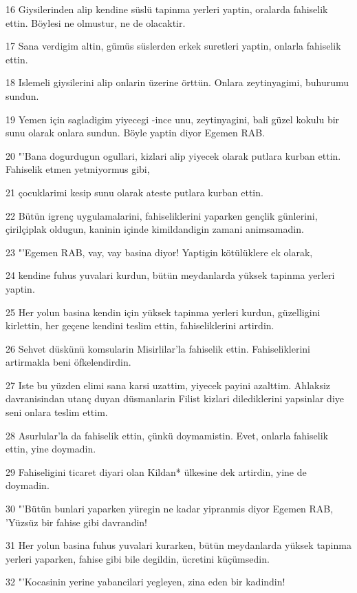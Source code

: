\par 16 Giysilerinden alip kendine süslü tapinma yerleri yaptin, oralarda fahiselik ettin. Böylesi ne olmustur, ne de olacaktir.
\par 17 Sana verdigim altin, gümüs süslerden erkek suretleri yaptin, onlarla fahiselik ettin.
\par 18 Islemeli giysilerini alip onlarin üzerine örttün. Onlara zeytinyagimi, buhurumu sundun.
\par 19 Yemen için sagladigim yiyecegi -ince unu, zeytinyagini, bali güzel kokulu bir sunu olarak onlara sundun. Böyle yaptin diyor Egemen RAB.
\par 20 "'Bana dogurdugun ogullari, kizlari alip yiyecek olarak putlara kurban ettin. Fahiselik etmen yetmiyormus gibi,
\par 21 çocuklarimi kesip sunu olarak ateste putlara kurban ettin.
\par 22 Bütün igrenç uygulamalarini, fahiseliklerini yaparken gençlik günlerini, çirilçiplak oldugun, kaninin içinde kimildandigin zamani animsamadin.
\par 23 "'Egemen RAB, vay, vay basina diyor! Yaptigin kötülüklere ek olarak,
\par 24 kendine fuhus yuvalari kurdun, bütün meydanlarda yüksek tapinma yerleri yaptin.
\par 25 Her yolun basina kendin için yüksek tapinma yerleri kurdun, güzelligini kirlettin, her geçene kendini teslim ettin, fahiseliklerini artirdin.
\par 26 Sehvet düskünü komsularin Misirlilar'la fahiselik ettin. Fahiseliklerini artirmakla beni öfkelendirdin.
\par 27 Iste bu yüzden elimi sana karsi uzattim, yiyecek payini azalttim. Ahlaksiz davranisindan utanç duyan düsmanlarin Filist kizlari dilediklerini yapsinlar diye seni onlara teslim ettim.
\par 28 Asurlular'la da fahiselik ettin, çünkü doymamistin. Evet, onlarla fahiselik ettin, yine doymadin.
\par 29 Fahiseligini ticaret diyari olan Kildan* ülkesine dek artirdin, yine de doymadin.
\par 30 "'Bütün bunlari yaparken yüregin ne kadar yipranmis diyor Egemen RAB, 'Yüzsüz bir fahise gibi davrandin!
\par 31 Her yolun basina fuhus yuvalari kurarken, bütün meydanlarda yüksek tapinma yerleri yaparken, fahise gibi bile degildin, ücretini küçümsedin.
\par 32 "'Kocasinin yerine yabancilari yegleyen, zina eden bir kadindin!
